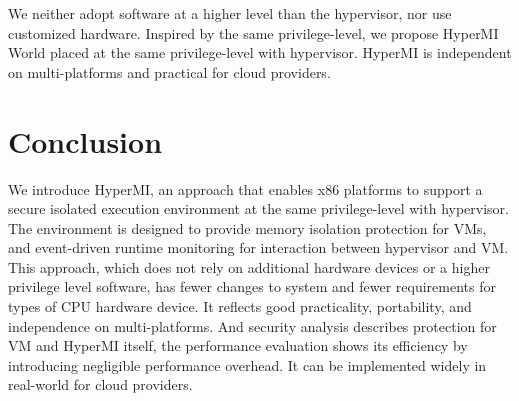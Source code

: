 \documentclass[conference]{IEEEtran}
\begin{document}
We neither adopt software at a higher level than the hypervisor, nor use customized hardware. Inspired by the same privilege-level, we propose HyperMI World placed at the same privilege-level with hypervisor. HyperMI is independent on multi-platforms and practical for cloud providers.

\section{Conclusion}\label{sec:conclusion}
We introduce HyperMI, an approach that enables x86 platforms to support a secure isolated execution environment at the same privilege-level with hypervisor. The environment is designed to provide memory isolation protection for VMs, and event-driven runtime monitoring for interaction between hypervisor and VM. This approach, which does not rely on additional hardware devices or a higher privilege level software, has fewer changes to system and fewer requirements for types of CPU hardware device. It reflects good practicality, portability, and independence on multi-platforms. And security analysis describes protection for VM and HyperMI itself, the performance evaluation shows its efficiency by introducing negligible performance overhead. It can be implemented widely in real-world for cloud providers.


 

\end{document}
